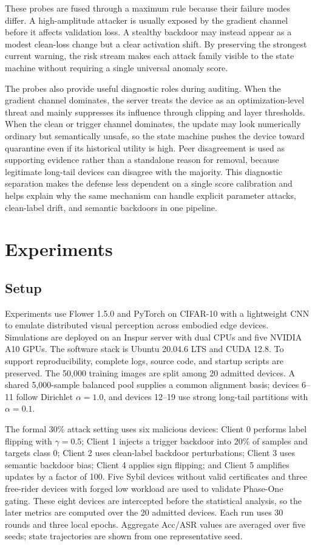 \documentclass[runningheads,orivec]{llncs}
\begin{document}
These probes are fused through a maximum rule because their failure modes differ. A high-amplitude attacker is usually exposed by the gradient channel before it affects validation loss. A stealthy backdoor may instead appear as a modest clean-loss change but a clear activation shift. By preserving the strongest current warning, the risk stream makes each attack family visible to the state machine without requiring a single universal anomaly score.

The probes also provide useful diagnostic roles during auditing. When the gradient channel dominates, the server treats the device as an optimization-level threat and mainly suppresses its influence through clipping and layer thresholds. When the clean or trigger channel dominates, the update may look numerically ordinary but semantically unsafe, so the state machine pushes the device toward quarantine even if its historical utility is high. Peer disagreement is used as supporting evidence rather than a standalone reason for removal, because legitimate long-tail devices can disagree with the majority. This diagnostic separation makes the defense less dependent on a single score calibration and helps explain why the same mechanism can handle explicit parameter attacks, clean-label drift, and semantic backdoors in one pipeline.

\section{Experiments}

\subsection{Setup}

Experiments use Flower 1.5.0 and PyTorch on CIFAR-10 with a lightweight CNN to emulate distributed visual perception across embodied edge devices. Simulations are deployed on an Inspur server with dual CPUs and five NVIDIA A10 GPUs. The software stack is Ubuntu 20.04.6 LTS and CUDA 12.8. To support reproducibility, complete logs, source code, and startup scripts are preserved. The 50,000 training images are split among 20 admitted devices. A shared 5,000-sample balanced pool supplies a common alignment basis; devices 6--11 follow Dirichlet $\alpha=1.0$, and devices 12--19 use strong long-tail partitions with $\alpha=0.1$.

The formal 30\% attack setting uses six malicious devices: Client 0 performs label flipping with $\gamma=0.5$; Client 1 injects a trigger backdoor into 20\% of samples and targets class 0; Client 2 uses clean-label backdoor perturbations; Client 3 uses semantic backdoor bias; Client 4 applies sign flipping; and Client 5 amplifies updates by a factor of 100. Five Sybil devices without valid certificates and three free-rider devices with forged low workload are used to validate Phase-One gating. These eight devices are intercepted before the statistical analysis, so the later metrics are computed over the 20 admitted devices. Each run uses 30 rounds and three local epochs. Aggregate Acc/ASR values are averaged over five seeds; state trajectories are shown from one representative seed.
\end{document}
